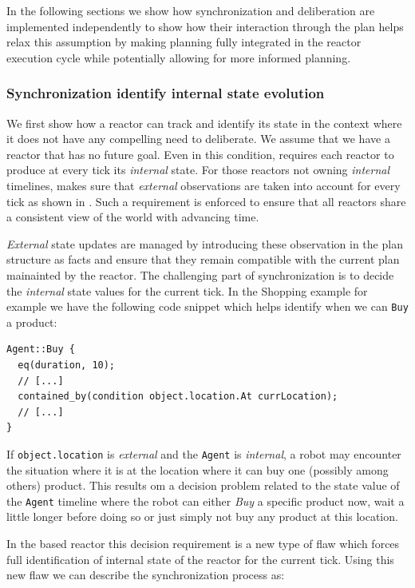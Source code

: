In the following sections we show how synchronization and deliberation
are implemented independently to show how their interaction through
the plan helps relax this assumption by making planning fully
integrated in the reactor execution cycle while potentially allowing
for more informed planning.

\subsubsection{Synchronization identify internal state evolution}
\label{sec:arch:synch}

We first show how a reactor can track and identify its state in the
context where it does not have any compelling need to deliberate. We
assume that we have a reactor that has no future goal. Even in this
condition, \rx requires each reactor to produce at every tick its {\em
  internal} state. For those reactors not owning {\em internal}
timelines, \rx makes sure that {\em external} observations are taken
into account for every tick as shown in \cite{py10}. Such a
requirement is enforced to ensure that all reactors share a consistent
view of the world with advancing time.

{\em External} state updates are managed by introducing these
observation in the plan structure as facts and ensure that they remain
compatible with the current plan mainainted by the reactor. The
challenging part of synchronization is to decide the {\em internal}
state values for the current tick. In the Shopping example for example
we have the following code snippet which helps identify when we can
\texttt{Buy} a product:

\begin{verbatim}
Agent::Buy {
  eq(duration, 10);
  // [...]
  contained_by(condition object.location.At currLocation);
  // [...]
}
\end{verbatim}

If \texttt{object.location} is {\em external} and the \texttt{Agent}
is {\em internal}, a robot may encounter the situation where it is at
the location where it can buy one (possibly among others)
product. This results om a decision problem related to the state value
of the \texttt{Agent} timeline where the robot can either {\em Buy} a
specific product now, wait a little longer before doing so or just
simply not buy any product at this location.

In the \eu based reactor this decision requirement is a new type of
flaw which forces full identification of internal state of the reactor
for the current tick. Using this new flaw we can describe the
synchronization process as:

